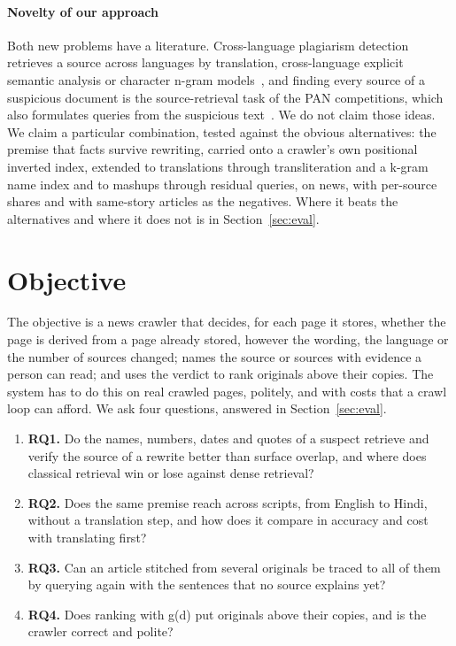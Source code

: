 \documentclass[11pt,a4paper]{article}
\begin{document}
\paragraph{Novelty of our approach} Both new problems have a literature. Cross-language plagiarism detection retrieves a source across languages by translation, cross-language explicit semantic analysis or character n-gram models~\cite{potthast2011}, and finding every source of a suspicious document is the source-retrieval task of the PAN competitions, which also formulates queries from the suspicious text~\cite{hagen2015}. We do not claim those ideas. We claim a particular combination, tested against the obvious alternatives: the premise that facts survive rewriting, carried onto a crawler's own positional inverted index, extended to translations through transliteration and a k-gram name index and to mashups through residual queries, on news, with per-source shares and with same-story articles as the negatives. Where it beats the alternatives and where it does not is in Section~\ref{sec:eval}.

\section{Objective}
\label{sec:objective}

The objective is a news crawler that decides, for each page it stores, whether the page is derived from a page already stored, however the wording, the language or the number of sources changed; names the source or sources with evidence a person can read; and uses the verdict to rank originals above their copies. The system has to do this on real crawled pages, politely, and with costs that a crawl loop can afford. We ask four questions, answered in Section~\ref{sec:eval}.

\begin{enumerate}
\item \textbf{RQ1.} Do the names, numbers, dates and quotes of a suspect retrieve and verify the source of a rewrite better than surface overlap, and where does classical retrieval win or lose against dense retrieval?
\item \textbf{RQ2.} Does the same premise reach across scripts, from English to Hindi, without a translation step, and how does it compare in accuracy and cost with translating first?
\item \textbf{RQ3.} Can an article stitched from several originals be traced to all of them by querying again with the sentences that no source explains yet?
\item \textbf{RQ4.} Does ranking with g(d) put originals above their copies, and is the crawler correct and polite?
\end{enumerate}
\end{document}
